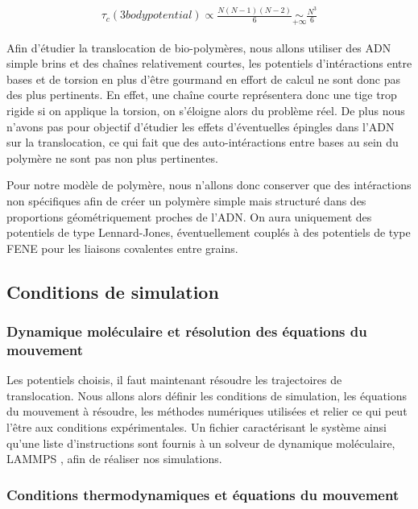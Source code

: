 \begin{eqnarray}
\tau_c(3bodypotential) \propto \frac{N(N-1)(N-2)}{6} \underset{+\infty}{\sim} \frac{N^3}{6}
\label{3bodypot}
\end{eqnarray}



Afin d'étudier la translocation de bio-polymères, nous allons utiliser des ADN simple brins et des chaînes relativement courtes, les potentiels d'intéractions entre bases et de torsion en plus d'être gourmand en effort de calcul ne sont donc pas des plus pertinents. En effet, une chaîne courte représentera donc une tige trop rigide si on applique la torsion, on s'éloigne alors du problème réel. De plus nous n'avons pas pour objectif d'étudier les effets d'éventuelles épingles dans l'ADN sur la translocation, ce qui fait que des auto-intéractions entre bases au sein du polymère ne sont pas non plus pertinentes.

Pour notre modèle de polymère, nous n'allons donc conserver que des intéractions non spécifiques afin de créer un polymère simple mais structuré dans des proportions géométriquement proches de l'ADN. On aura uniquement des potentiels de type Lennard-Jones, éventuellement couplés à des potentiels de type FENE pour les liaisons covalentes entre grains.

\subsection{Conditions de simulation}

\subsubsection{Dynamique moléculaire et résolution des équations du mouvement}

Les potentiels choisis, il faut maintenant résoudre les trajectoires de translocation. Nous allons alors définir les conditions de simulation, les équations du mouvement à résoudre, les méthodes numériques utilisées et relier ce qui peut l'être aux conditions expérimentales.
Un fichier caractérisant le système ainsi qu'une liste d'instructions sont fournis à un solveur de dynamique moléculaire, LAMMPS \cite{lammps}, afin de réaliser nos simulations.

\subsubsection{Conditions thermodynamiques et équations du mouvement}



